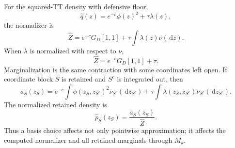 \documentclass[11pt]{article}
\numberwithin{equation}{section}
\newcommand{\dd}{\,\mathrm d}
\begin{document}
For the squared-TT density with defensive floor,
\begin{equation}
    \widehat q(z)=e^{-c}\phi(z)^2+\tau\lambda(z),
    \label{eq:p33-density-with-floor}
\end{equation}
the normalizer is
\begin{equation}
    \widehat Z=e^{-c}G_D[1,1]+\tau\int\lambda(z)\nu(\dd z).
    \label{eq:p33-full-normalizer}
\end{equation}
When \(\lambda\) is normalized with respect to \(\nu\),
\begin{equation}
    \widehat Z=e^{-c}G_D[1,1]+\tau.
    \label{eq:p33-normalized-floor}
\end{equation}
Marginalization is the same contraction with some coordinates left open.  If
coordinate block \(S\) is retained and \(S^c\) is integrated out, then
\begin{equation}
    a_S(z_S)
    =
    e^{-c}
    \int \phi(z_S,z_{S^c})^2\nu_{S^c}(\dd z_{S^c})
    +\tau\int\lambda(z_S,z_{S^c})\nu_{S^c}(\dd z_{S^c}).
    \label{eq:p33-retained-marginal}
\end{equation}
The normalized retained density is
\begin{equation}
    \widehat p_S(z_S)=\frac{a_S(z_S)}{\widehat Z}.
    \label{eq:p33-retained-normalized}
\end{equation}
Thus a basis choice affects not only pointwise approximation; it affects the
computed normalizer and all retained marginals through \(M_k\).
\end{document}
